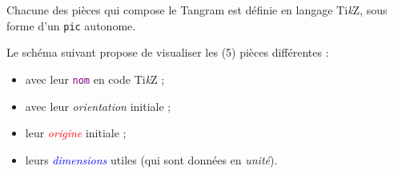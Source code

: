 \documentclass{article}
\providecommand\tikzlogo{Ti\textit{k}Z}
\begin{document}
Chacune des pièces qui compose le Tangram est définie en langage \tikzlogo, sous forme d'un \texttt{pic} autonome.

\medskip

Le schéma suivant propose de visualiser les (5) pièces différentes :

\begin{itemize}
	\item avec leur \textcolor{purple}{\texttt{nom}} en code \tikzlogo{} ;
	\item avec leur \textit{orientation} initiale ;
	\item leur \textcolor{red}{\textit{origine}} initiale ;
	\item leurs \textcolor{blue}{\textit{dimensions}} utiles (qui sont données en \textit{unité}).
\end{itemize}
\end{document}
